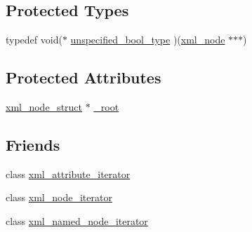 \subsection*{Protected Types}
\begin{DoxyCompactItemize}
\item 
typedef void($\ast$ \hyperlink{classpugi_1_1xml__node_a5787a5097d439a75a335290cb6fcf2a8}{unspecified\-\_\-bool\-\_\-type} )(\hyperlink{classpugi_1_1xml__node}{xml\-\_\-node} $\ast$$\ast$$\ast$)
\end{DoxyCompactItemize}
\subsection*{Protected Attributes}
\begin{DoxyCompactItemize}
\item 
\hyperlink{structpugi_1_1xml__node__struct}{xml\-\_\-node\-\_\-struct} $\ast$ \hyperlink{classpugi_1_1xml__node_a45a5b342de1e37a60565f7693f03cc08}{\-\_\-root}
\end{DoxyCompactItemize}
\subsection*{Friends}
\begin{DoxyCompactItemize}
\item 
class \hyperlink{classpugi_1_1xml__node_aeff34dec57ee910e3344631528969539}{xml\-\_\-attribute\-\_\-iterator}
\item 
class \hyperlink{classpugi_1_1xml__node_aa25e28e29a8cec4daa60cdd2d5934757}{xml\-\_\-node\-\_\-iterator}
\item 
class \hyperlink{classpugi_1_1xml__node_a1e60ab2fa6d6adb56f4b833761fc0b66}{xml\-\_\-named\-\_\-node\-\_\-iterator}
\end{DoxyCompactItemize}


